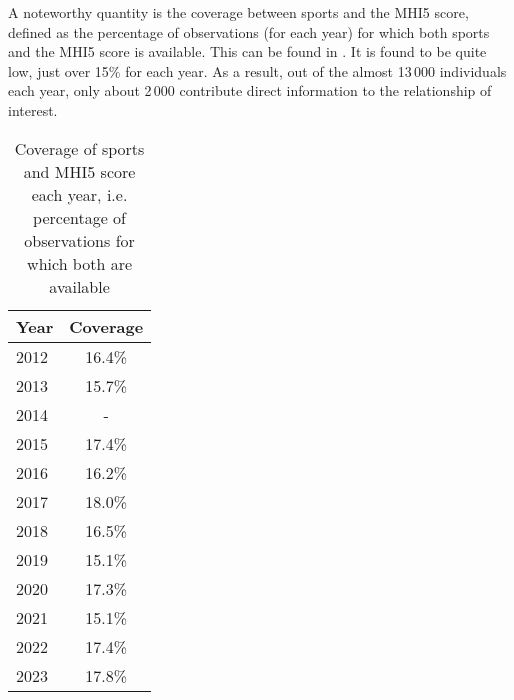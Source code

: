 A noteworthy quantity is the coverage between sports and the MHI5 score, defined as the percentage of observations
(for each year) for which both sports and the MHI5 score is available.
This can be found in . It is found to be quite low, just over 15\% for each year. As a result,
out of the almost 13\,000 individuals each year, only about 2\,000 contribute direct information to the relationship of interest.

\begin{table}[htbp]
    \centering
    \caption{Coverage of sports and MHI5 score each year, i.e. percentage of observations for which both are available}
    \label{tab:data:coverage}
    \begin{tabular}{lc}
        \toprule
        Year & Coverage \\
        \hline
        2012 & 16.4\% \\
        2013 & 15.7\% \\
        2014 & -      \\
        2015 & 17.4\% \\
        2016 & 16.2\% \\
        2017 & 18.0\% \\
        2018 & 16.5\% \\
        2019 & 15.1\% \\
        2020 & 17.3\% \\
        2021 & 15.1\% \\
        2022 & 17.4\% \\
        2023 & 17.8\% \\
        \bottomrule
    \end{tabular}
\end{table}

